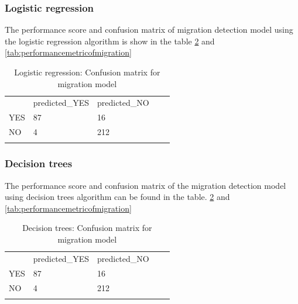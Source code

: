 \subsubsection{Logistic regression}
The performance score and confusion matrix of migration detection model using the logistic regression algorithm is show in the table \ref{tab:confusionmatrix_migrationtweets} and \ref{tab:performancemetricofmigration}

\begin{table}[]
\centering
\begin{tabular}{lllll}
\cline{1-3}
\multicolumn{1}{|l|}{}   & \multicolumn{1}{l|}{predicted\_YES} & \multicolumn{1}{l|}{predicted\_NO}  &  &  \\ \cline{1-3}
\multicolumn{1}{|l|}{YES} & \multicolumn{1}{l|}{87}  & \multicolumn{1}{l|}{16} &  &  \\ \cline{1-3}
\multicolumn{1}{|l|}{NO}   & \multicolumn{1}{l|}{4}  & \multicolumn{1}{l|}{212}  &  &  \\ \cline{1-3}
                            &                           &                           &  & 
\end{tabular}
\caption{Logistic regression: Confusion matrix for migration model}
\label{tab:confusionmatrix_migrationtweets}
\end{table}





\subsubsection{Decision trees}
The performance score and confusion matrix of the migration detection model using decision trees algorithm can be found in the table.
 \ref{tab:confusionmatrix_migrationtweets} and \ref{tab:performancemetricofmigration}

\begin{table}[]
\centering
\begin{tabular}{lllll}
\cline{1-3}
\multicolumn{1}{|l|}{}   & \multicolumn{1}{l|}{predicted\_YES} & \multicolumn{1}{l|}{predicted\_NO}  &  &  \\ \cline{1-3}
\multicolumn{1}{|l|}{YES} & \multicolumn{1}{l|}{87}  & \multicolumn{1}{l|}{16} &  &  \\ \cline{1-3}
\multicolumn{1}{|l|}{NO}   & \multicolumn{1}{l|}{4}  & \multicolumn{1}{l|}{212}  &  &  \\ \cline{1-3}
                            &                           &                           &  & 
\end{tabular}
\caption{Decision trees: Confusion matrix for migration model}
\label{tab:confusionmatrix_migrationtweets}
\end{table}






